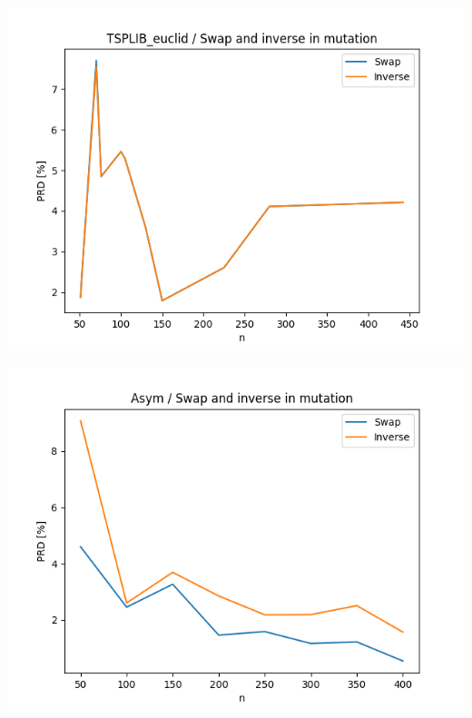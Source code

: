 \documentclass{article}
\begin{document}
\begin{center}
\includegraphics[width=\textwidth, 
                   height = 0.4\textheight, 
                   keepaspectratio]
                  {plots/tsplib_euclid_6_swap_inverse} 
\end{center}

\begin{center}
\includegraphics[width=\textwidth, 
                   height = 0.4\textheight, 
                   keepaspectratio]
                  {plots/asym_6_swap_inverse} 
\end{center}
\end{document}
